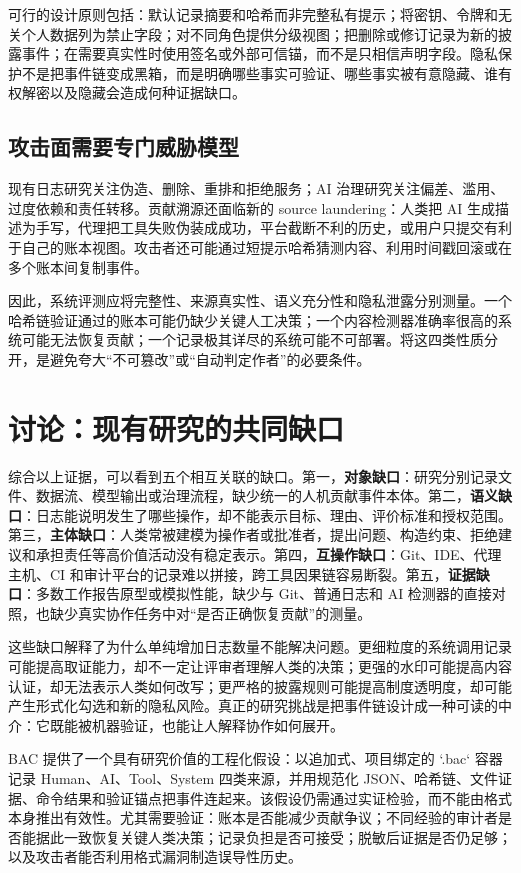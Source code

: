 \documentclass[UTF8,a4paper,12pt]{ctexart}
\begin{document}
可行的设计原则包括：默认记录摘要和哈希而非完整私有提示；将密钥、令牌和无关个人数据列为禁止字段；对不同角色提供分级视图；把删除或修订记录为新的披露事件；在需要真实性时使用签名或外部可信锚，而不是只相信声明字段。隐私保护不是把事件链变成黑箱，而是明确哪些事实可验证、哪些事实被有意隐藏、谁有权解密以及隐藏会造成何种证据缺口。

\subsection{攻击面需要专门威胁模型}
现有日志研究关注伪造、删除、重排和拒绝服务；AI 治理研究关注偏差、滥用、过度依赖和责任转移。贡献溯源还面临新的 source laundering：人类把 AI 生成描述为手写，代理把工具失败伪装成成功，平台截断不利的历史，或用户只提交有利于自己的账本视图。攻击者还可能通过短提示哈希猜测内容、利用时间戳回滚或在多个账本间复制事件。

因此，系统评测应将完整性、来源真实性、语义充分性和隐私泄露分别测量。一个哈希链验证通过的账本可能仍缺少关键人工决策；一个内容检测器准确率很高的系统可能无法恢复贡献；一个记录极其详尽的系统可能不可部署。将这四类性质分开，是避免夸大“不可篡改”或“自动判定作者”的必要条件。

\section{讨论：现有研究的共同缺口}
综合以上证据，可以看到五个相互关联的缺口。第一，\textbf{对象缺口}：研究分别记录文件、数据流、模型输出或治理流程，缺少统一的人机贡献事件本体。第二，\textbf{语义缺口}：日志能说明发生了哪些操作，却不能表示目标、理由、评价标准和授权范围。第三，\textbf{主体缺口}：人类常被建模为操作者或批准者，提出问题、构造约束、拒绝建议和承担责任等高价值活动没有稳定表示。第四，\textbf{互操作缺口}：Git、IDE、代理主机、CI 和审计平台的记录难以拼接，跨工具因果链容易断裂。第五，\textbf{证据缺口}：多数工作报告原型或模拟性能，缺少与 Git、普通日志和 AI 检测器的直接对照，也缺少真实协作任务中对“是否正确恢复贡献”的测量。

这些缺口解释了为什么单纯增加日志数量不能解决问题。更细粒度的系统调用记录可能提高取证能力，却不一定让评审者理解人类的决策；更强的水印可能提高内容认证，却无法表示人类如何改写；更严格的披露规则可能提高制度透明度，却可能产生形式化勾选和新的隐私风险。真正的研究挑战是把事件链设计成一种可读的中介：它既能被机器验证，也能让人解释协作如何展开。

BAC 提供了一个具有研究价值的工程化假设：以追加式、项目绑定的 `.bac` 容器记录 Human、AI、Tool、System 四类来源，并用规范化 JSON、哈希链、文件证据、命令结果和验证锚点把事件连起来。该假设仍需通过实证检验，而不能由格式本身推出有效性。尤其需要验证：账本是否能减少贡献争议；不同经验的审计者是否能据此一致恢复关键人类决策；记录负担是否可接受；脱敏后证据是否仍足够；以及攻击者能否利用格式漏洞制造误导性历史。
\end{document}
